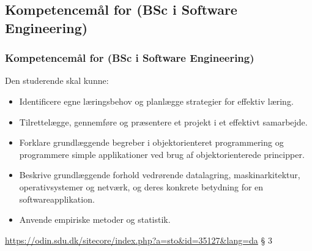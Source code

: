 \documentclass[t, aspectratio=169]{beamer}
\begin{document}
\begin{frame}[fragile]
{
  }
\end{frame}

\subsection{Kompetencemål for (BSc i Software Engineering)}
\begin{frame}[fragile]
  \frametitle{Kompetencemål for (BSc i Software Engineering)}
  \vspace{3mm}
  Den studerende skal kunne:
  \begin{itemize}
    \item Identificere egne læringsbehov og planlægge strategier for effektiv læring.
    \item Tilrettelægge, gennemføre og præsentere et projekt i et effektivt samarbejde.
    \item Forklare grundlæggende begreber i objektorienteret programmering og programmere simple applikationer ved brug af objektorienterede principper.
    \item Beskrive grundlæggende forhold vedrørende datalagring, maskinarkitektur, operativsystemer og netværk, og deres konkrete betydning for en softwareapplikation.
    \item Anvende empiriske metoder og statistik.
  \end{itemize}
  
  \vspace{5mm}
  \textcolor{blue}{\url{https://odin.sdu.dk/sitecore/index.php?a=sto&id=35127&lang=da}} § 3
\end{frame}
\end{document}
